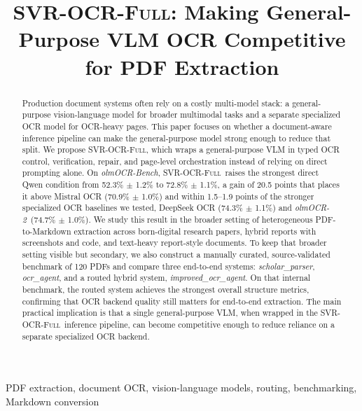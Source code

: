 \documentclass[conference]{IEEEtran}
\newcommand{\papername}[1]{\textit{#1}}
\newcommand{\scholar}{\papername{scholar\_parser}}
\newcommand{\ocragent}{\papername{ocr\_agent}}
\newcommand{\improvedocr}{\papername{improved\_ocr\_agent}}
\newcommand{\svrocr}{\textsc{SVR-OCR-Full}}
\newcommand{\olmocr}{\papername{olmOCR-2}}
\begin{document}
\title{\svrocr: Making General-Purpose VLM OCR Competitive for PDF Extraction}

\author{
}

\maketitle

\begin{abstract}
Production document systems often rely on a costly multi-model stack: a general-purpose vision-language model for broader multimodal tasks and a separate specialized OCR model for OCR-heavy pages. This paper focuses on whether a document-aware inference pipeline can make the general-purpose model strong enough to reduce that split. We propose \svrocr, which wraps a general-purpose VLM in typed OCR control, verification, repair, and page-level orchestration instead of relying on direct prompting alone. On \papername{olmOCR-Bench}, \svrocr\ raises the strongest direct Qwen condition from 52.3\% $\pm$ 1.2\% to 72.8\% $\pm$ 1.1\%, a gain of 20.5 points that places it above Mistral OCR (70.9\% $\pm$ 1.0\%) and within 1.5--1.9 points of the stronger specialized OCR baselines we tested, DeepSeek OCR (74.3\% $\pm$ 1.1\%) and \olmocr\ (74.7\% $\pm$ 1.0\%). We study this result in the broader setting of heterogeneous PDF-to-Markdown extraction across born-digital research papers, hybrid reports with screenshots and code, and text-heavy report-style documents. To keep that broader setting visible but secondary, we also construct a manually curated, source-validated benchmark of 120 PDFs and compare three end-to-end systems: \scholar, \ocragent, and a routed hybrid system, \improvedocr. On that internal benchmark, the routed system achieves the strongest overall structure metrics, confirming that OCR backend quality still matters for end-to-end extraction. The main practical implication is that a single general-purpose VLM, when wrapped in the \svrocr\ inference pipeline, can become competitive enough to reduce reliance on a separate specialized OCR backend.
\end{abstract}

\begin{IEEEkeywords}
PDF extraction, document OCR, vision-language models, routing, benchmarking, Markdown conversion
\end{IEEEkeywords}
\end{document}
